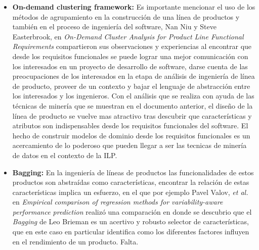 \begin{itemize}
\item {\textbf{On-demand clustering framework:}}
Es importante mencionar el uso de los métodos de agrupamiento en la construcción de una línea de productos y también  en el proceso de ingeniería del software,  Nan Niu y  Steve Easterbrook, en \textit{On-Demand Cluster Analysis for Product Line Functional Requirements}\cite{Niu2008} compartieron sus observaciones y experiencias al encontrar que desde los requisitos funcionales se puede lograr una mejor comunicación con los interesados en un proyecto de desarrollo de software, darse cuenta de las preocupaciones  de los interesados en la etapa de análisis de ingeniería de línea de producto, proveer de un contexto y bajar el lenguaje de abstracción entre los interesados y los ingenieros. Con el análisis que se realiza con ayuda de las técnicas de minería que se muestran en el documento anterior, el diseño de la línea de producto se vuelve mas atractivo tras descubrir que características y atributos son indispensables desde los requisitos funcionales del software. El hecho de construir modelos de dominio desde los requisitos funcionales es un acercamiento de lo poderoso que pueden llegar  a ser las tecnicas de minería de datos en el contexto de la ILP.

\item {\textbf{Bagging:}}
En la ingeniería de líneas de productos las funcionalidades de estos productos son abstraídas como características, encontrar la relación de estas características implica un esfuerzo, en el que por ejemplo Pavel Valov, \textit{et al.} en \textit{Empirical comparison of regression methods for variability-aware performance prediction}\cite{Valov2015} realizó una comparación en donde se descubrio que el \textit{Bagging} de Leo Brieman es un acertivo y robusto selector de características, que en este caso en particular identifica como los diferentes factores influyen en el rendimiento de un producto. Falta.



\end{itemize}
